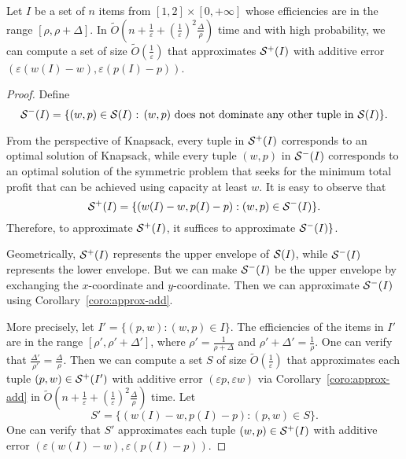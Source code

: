 \documentclass[a4paper,UKenglish,cleveref, autoref, thm-restate, pdfa]{lipics-v2021}
\newcommand{\eps}{\varepsilon}
\begin{document}
\begin{corollary}\label{coro:approx-del}
    Let $I$ be a set of $n$ items from $[1, 2] \times [0, +\infty]$ whose efficiencies are in the range $[\rho, \rho + \Delta]$. In $\tilde{O}(n + \frac{1}{\eps} + (\frac{1}{\eps})^2 \frac{\Delta}{\rho})$ time and with high probability, we can compute a set of size $\tilde{O}(\frac{1}{\eps})$ that approximates ${\cal S}^+(I)$ with additive error $(\eps(w(I) - w), \eps(p(I) - p))$.
\end{corollary}
\begin{proof}
    Define
    \[
        {\cal S}^-(I) = \{\text{$(w, p) \in {\cal S}(I)$ : $(w,p)$ does not dominate any other tuple in ${\cal S}(I)$}\}.
    \]
    
    From the perspective of Knapsack, every tuple in ${\cal S}^+(I)$ corresponds to an optimal solution of Knapsack, while every tuple $(w,p)$ in ${\cal S}^-(I)$ corresponds to an optimal solution of the symmetric problem that seeks for the minimum total profit that can be achieved using capacity at least $w$.  It is easy to observe that
    \[
        {\cal S}^+(I) = \{(w(I) - w, p(I) - p) : (w, p) \in {\cal S}^-(I)\}.
    \]
    Therefore, to approximate ${\cal S}^+(I)$, it suffices to approximate ${\cal S}^-(I)\}$.

    Geometrically, ${\cal S}^+(I)$ represents the upper envelope of ${\cal S}(I)$, while ${\cal S}^-(I)$ represents the lower envelope.  But we can make ${\cal S}^-(I)$ be the upper envelope by exchanging the $x$-coordinate and $y$-coordinate. Then we can approximate ${\cal S}^-(I)$ using Corollary~\ref{coro:approx-add}.

    More precisely, let $I' = \{(p, w) : (w, p) \in I\}$. The efficiencies of the items in $I'$ are in the range $[\rho', \rho' + \Delta']$, where $\rho' = \frac{1}{\rho + \Delta}$ and $\rho' + \Delta' = \frac{1}{\rho}$. One can verify that $\frac{\Delta'}{\rho'} = \frac{\Delta}{\rho}$. Then we can compute a set $S$ of size $\tilde{O}(\frac{1}{\eps})$ that approximates each tuple $(p,w) \in {\cal S}^+(I')$  with additive error $(\eps p, \eps w)$ via Corollary~\ref{coro:approx-add} in $\tilde{O}(n + \frac{1}{\eps}+ (\frac{1}{\eps})^2\frac{\Delta}{\rho})$ time. Let 
    \[
        S'  = \{ (w(I) - w, p(I) - p) : (p, w)\in S\}.
    \]
    One can verify that $S'$ approximates each tuple $(w, p) \in {\cal S}^+(I)$ with additive error $(\eps(w(I) - w), \eps(p(I) - p))$.
\end{proof}
\end{document}
